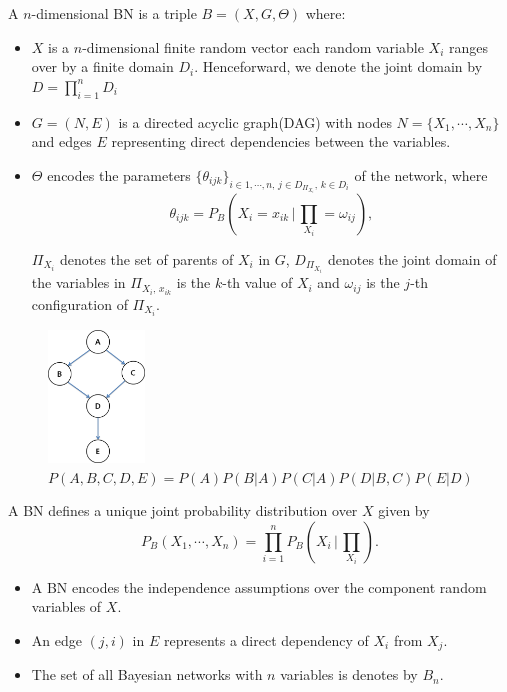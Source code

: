\documentclass[runningheads,a4paper]{llncs}
\begin{document}
A $n$-dimensional BN is a triple $B = (X, G, \Theta)$ where:

\begin{itemize}
	\item $X$ is a $n$-dimensional finite random vector each random variable $X_{i}$ ranges over by a finite domain $D_{i}$. Henceforward, we denote the joint domain by $D=\prod_{i=1}^{n}D_{i}$
	
	\item $G = (N, E)$ is a directed acyclic graph(DAG) with nodes $N = \{X_{1}, \cdots, X_{n}\}$ and edges $E$ representing direct dependencies between the variables.
	
	\item $\Theta$ encodes the parameters $\{\theta_{ijk}\}_{i\in1,\cdots,n, \, j\in D_{\Pi_{X_{i}}}, \, k\in D_{i}}$ of the network, where
	$$\theta_{ijk}=P_{B}\left(X_{i}=x_{ik} \, | \, \prod_{X_{i}}=\omega_{ij}\right),$$
	
	$\Pi_{X_{i}}$ denotes the set of parents of $X_{i}$ in $G$, $D_{\Pi_{X_{i}}}$ denotes the joint domain of the variables in $\Pi_{X_{i}, \, x_{ik}}$ is the $k$-th value of $X_{i}$ and $\omega_{ij}$ is the $j$-th configuration of $\Pi_{X_{i}}$.
\end{itemize}

\begin{figure}
	\centering
	\includegraphics[height=100pt]{images/image01}
	\caption{\footnotesize{$P(A,B,C,D,E)=P(A)P(B|A)P(C|A)P(D|B,C)P(E|D)$}}
\end{figure}	

A BN defines a unique joint probability distribution over $X$ given by
$$P_{B}(X_{1},\cdots,X_{n})=\prod_{i=1}^{n}P_{B}\left(X_{i} \, | \, \prod_{X_{i}}\right).$$

\begin{itemize}
	\item A BN encodes the independence assumptions over the component random variables of $X$.
	
	\item An edge $(j, i)$ in $E$ represents a direct dependency of $X_{i}$ from $X_{j}$.
	
	\item The set of all Bayesian networks with $n$ variables is denotes by $B_{n}$.
\end{itemize}
\end{document}

